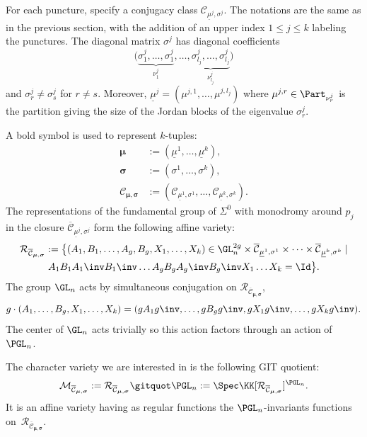 For each puncture, specify a conjugacy class $\mathcal{C}_{\underline{\mu}^j,\sigma^j}$. The notations are the same as in the previous section, with the addition of an upper index $1\le j\le k$ labeling the punctures. The diagonal matrix $\sigma^j$ has diagonal coefficients
\[
\bigl(\underbrace{\sigma^j_1,\dots,\sigma^j_{1}}_{\nu^j_1},\dots, \underbrace{\sigma^j_{l_j},\dots,\sigma^j_{l_j}}_{\nu^j_{l_j}}\bigr)
\]
and $\sigma^j_r \ne \sigma^j_s$ for $r\ne s$.
Moreover, $\underline{\mu}^j=\left(\mu^{j,1},\dots,\mu^{j,l_j}\right)$ where $\mu^{j,r}\in \Part_{\nu^j_r}$ is the partition giving the size of the Jordan blocks of the eigenvalue $\sigma^j_r$.

A bold symbol is used to represent $k$-tuples:
\begin{equation}\label{eq_bold_kuple}
\begin{split}
\boldsymbol{\mu}& := (\underline{\mu}^1,\dots, \underline{\mu}^k), \\
\boldsymbol{\sigma} & :=(\sigma^1,\dots,\sigma^k),\\
\mathcal{C}_{\boldsymbol{\mu},\boldsymbol{\sigma}} & := (\mathcal{C}_{\underline{\mu}^1,\sigma^1}, \dots, \mathcal{C}_{\underline{\mu}^k,\sigma^k}).
\end{split}
\end{equation}
The representations of the fundamental group of $\Sigma^0$ with monodromy around $p_j$ in the closure $\overline{\mathcal{C}}_{\underline{\mu}^j,\sigma^j}$ form the following affine variety:
\begin{multline*}
\mathcal{R}_{\overline{\mathcal{C}}_{\boldsymbol{\mu},\boldsymbol{\sigma}}}:=\bigl\lbrace\left(A_1,B_1,\dots,A_g,B_g,X_1,\dots,X_k\right)\in \GL_n^{2g}\times \overline{\mathcal{C}}_{\underline{\mu}^1,\sigma^1}\times\dots\times \overline{\mathcal{C}}_{\underline{\mu}^k,\sigma^k}\mid \\ A_1 B_1 A_1\inv B_1\inv \dots A_g B_g A_g\inv B_g\inv X_1\dots X_k =\Id\bigr\rbrace.
\end{multline*}
The group $\GL_n$ acts by simultaneous conjugation on $\mathcal{R}_{\overline{\mathcal{C}}_{\boldsymbol{\mu},\boldsymbol{\sigma}}}$,
\begin{equation*}
g\cdot(A_1,\dots,B_g,X_1,\dots,X_k)=(g A_1 g\inv,\dots,g B_g g\inv,g X_1 g\inv,\dots,g X_k g\inv).
\end{equation*}
The center of $\GL_n$ acts trivially so this action factors through an action of $\PGL_n$.
\begin{definition}
The character variety we are interested in is the following GIT quotient:
\begin{equation*}
\mathcal{M}_{\overline{\mathcal{C}}_{\boldsymbol{\mu},\boldsymbol{\sigma}}} :=\mathcal{R}_{\overline{\mathcal{C}}_{\boldsymbol{\mu},\boldsymbol{\sigma}}} \gitquot\PGL_n :=\Spec \KK[ \mathcal{R}_{\overline{\mathcal{C}}_{\boldsymbol{\mu},\boldsymbol{\sigma}}}]^{\PGL_n}.
\end{equation*}
It is an affine variety having as regular functions the $\PGL_n$-invariants functions on~$\mathcal{R}_{\overline{\mathcal{C}}_{\boldsymbol{\mu},\boldsymbol{\sigma}}}$.
\end{definition}
